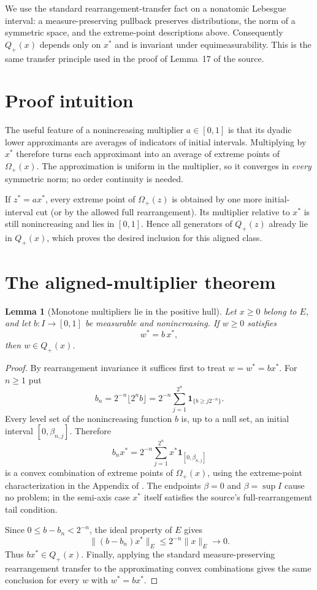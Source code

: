 \documentclass[11pt]{article}
\newtheorem{lemma}{Lemma}
\newcommand{\Qp}{Q_{+}}
\newcommand{\Op}{\Omega_{+}}
\begin{document}
We use the standard rearrangement-transfer fact on a nonatomic Lebesgue
interval: a measure-preserving pullback preserves distributions, the norm of
a symmetric space, and the extreme-point descriptions above.  Consequently
$\Qp(x)$ depends only on $x^*$ and is invariant under equimeasurability.  This
is the same transfer principle used in the proof of Lemma~17 of the source.

\section{Proof intuition}

The useful feature of a nonincreasing multiplier $a\in[0,1]$ is that its
dyadic lower approximants are averages of indicators of initial intervals.
Multiplying by $x^*$ therefore turns each approximant into an average of
extreme points of $\Op(x)$.  The approximation is uniform in the multiplier,
so it converges in \emph{every} symmetric norm; no order continuity is needed.

If $z^*=a x^*$, every extreme point of $\Op(z)$ is obtained by one more
initial-interval cut (or by the allowed full rearrangement).  Its multiplier
relative to $x^*$ is still nonincreasing and lies in $[0,1]$.  Hence all
generators of $\Qp(z)$ already lie in $\Qp(x)$, which proves the desired
inclusion for this aligned class.

\section{The aligned-multiplier theorem}

\begin{lemma}[Monotone multipliers lie in the positive hull]\label{lem:mult}
Let $x\geq0$ belong to $E$, and let $b:I\to[0,1]$ be measurable and
nonincreasing.  If $w\geq0$ satisfies
\[
                  w^*=b\,x^*,
\]
then $w\in\Qp(x)$.
\end{lemma}

\begin{proof}
By rearrangement invariance it suffices first to treat $w=w^*=b x^*$.
For $n\geq1$ put
\[
 b_n=2^{-n}\lfloor 2^n b\rfloor
     =2^{-n}\sum_{j=1}^{2^n}
       \mathbf 1_{\{b\geq j2^{-n}\}}.
\]
Every level set of the nonincreasing function $b$ is, up to a null set, an
initial interval $[0,\beta_{n,j}]$.  Therefore
\[
 b_nx^*
 =2^{-n}\sum_{j=1}^{2^n}
   x^*\mathbf 1_{[0,\beta_{n,j}]}
\]
is a convex combination of extreme points of $\Op(x)$, using the
extreme-point characterization in the Appendix of \cite{SZ}.  The endpoints
$\beta=0$ and $\beta=\sup I$ cause no problem; in the semi-axis case $x^*$
itself satisfies the source's full-rearrangement tail condition.

Since $0\leq b-b_n<2^{-n}$, the ideal property of $E$ gives
\[
 \|(b-b_n)x^*\|_E\leq 2^{-n}\|x\|_E\longrightarrow0.
\]
Thus $b x^*\in\Qp(x)$.  Finally, applying the standard
measure-preserving rearrangement transfer to the approximating convex
combinations gives the same conclusion for every $w$ with
$w^*=b x^*$.
\end{proof}
\end{document}

